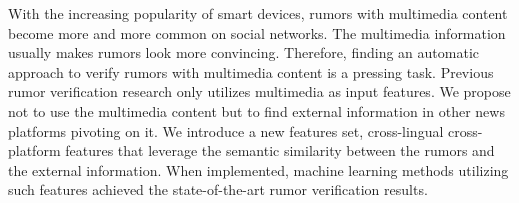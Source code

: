 With the increasing popularity of smart devices, rumors with multimedia content become more and more common on social networks. The multimedia information usually makes rumors look more convincing. Therefore, finding an automatic approach to verify rumors with multimedia content is a pressing task. Previous rumor verification research only utilizes multimedia as input features. We propose not to use the multimedia content but to find external information in other news platforms pivoting on it. We introduce a new features set, cross-lingual cross-platform features that leverage the semantic similarity between the rumors and the external information. When implemented, machine learning methods utilizing such features achieved the state-of-the-art rumor verification results.
